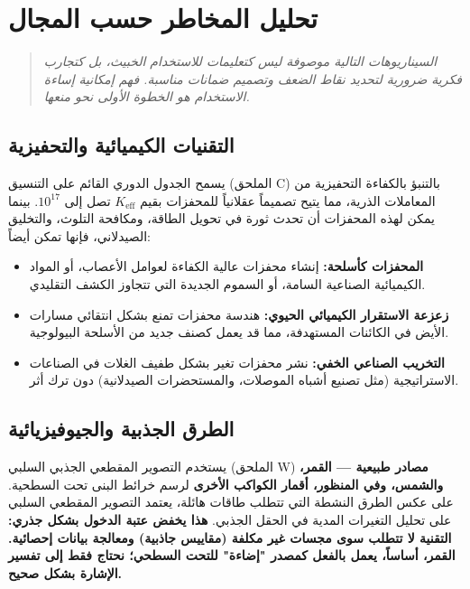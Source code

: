 \documentclass[12pt,a4paper]{article}
\theoremstyle{remark}
\newcommand{\Keff}{K_{\mathrm{eff}}}
\begin{document}
	\section{تحليل المخاطر حسب المجال}
	\label{sec:risks}
	
	\begin{quote}
		\emph{السيناريوهات التالية موصوفة ليس كتعليمات للاستخدام الخبيث، بل كتجارب فكرية ضرورية لتحديد نقاط الضعف وتصميم ضمانات مناسبة. فهم إمكانية إساءة الاستخدام هو الخطوة الأولى نحو منعها.}
	\end{quote}
	
	\subsection{التقنيات الكيميائية والتحفيزية}
	\label{subsec:chem}
	
	يسمح الجدول الدوري القائم على التنسيق (الملحق C) بالتنبؤ بالكفاءة التحفيزية من المعاملات الذرية، مما يتيح تصميماً عقلانياً للمحفزات بقيم \(\Keff\) تصل إلى \(10^{17}\). بينما يمكن لهذه المحفزات أن تحدث ثورة في تحويل الطاقة، ومكافحة التلوث، والتخليق الصيدلاني، فإنها تمكن أيضاً:
	\begin{itemize}[leftmargin=*]
		\item \textbf{المحفزات كأسلحة:} إنشاء محفزات عالية الكفاءة لعوامل الأعصاب، أو المواد الكيميائية الصناعية السامة، أو السموم الجديدة التي تتجاوز الكشف التقليدي.
		\item \textbf{زعزعة الاستقرار الكيميائي الحيوي:} هندسة محفزات تمنع بشكل انتقائي مسارات الأيض في الكائنات المستهدفة، مما قد يعمل كصنف جديد من الأسلحة البيولوجية.
		\item \textbf{التخريب الصناعي الخفي:} نشر محفزات تغير بشكل طفيف الغلات في الصناعات الاستراتيجية (مثل تصنيع أشباه الموصلات، والمستحضرات الصيدلانية) دون ترك أثر.
	\end{itemize}
	
	\subsection{الطرق الجذبية والجيوفيزيائية}
	\label{subsec:gravity}
	
	يستخدم التصوير المقطعي الجذبي السلبي (الملحق W) \textbf{مصادر طبيعية — القمر، والشمس، وفي المنظور، أقمار الكواكب الأخرى} لرسم خرائط البنى تحت السطحية. على عكس الطرق النشطة التي تتطلب طاقات هائلة، يعتمد التصوير المقطعي السلبي على تحليل التغيرات المدية في الحقل الجذبي. \textbf{هذا يخفض عتبة الدخول بشكل جذري: التقنية لا تتطلب سوى مجسات غير مكلفة (مقاييس جاذبية) ومعالجة بيانات إحصائية. القمر، أساساً، يعمل بالفعل كمصدر "إضاءة" للتحت السطحي؛ نحتاج فقط إلى تفسير الإشارة بشكل صحيح.}
	
\end{document}
